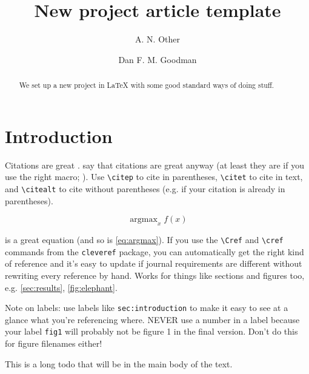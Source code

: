 \documentclass{article}
\title{New project article template}
\author[1]{A. N. Other}
\author[1]{Dan F. M. Goodman}
\affil[1]{Imperial College London}
\date{}
\DeclareMathOperator{\argmax}{argmax}
\newcommand{\todo}[1]{\marginpar{\scriptsize\color{red}\raggedright #1}}
\newcommand{\longtodo}[1]{{\color{red} #1}}
\begin{document}
\maketitle


\begin{abstract}
	\begin{itemize}
        We set up a new project in LaTeX with some good standard ways of doing stuff.
	\end{itemize}
\end{abstract}

\section{Introduction}\label{sec:introduction}

\todo{Are citations really great?}
Citations are great \citep{Goodman2009,perez-nieves_sparse_2021}.
\citet{Goodman2009} say that citations are great anyway (at least they are if you use the right macro; \citealt{perez-nieves_sparse_2021}). Use \texttt{\textbackslash{}citep} to cite in parentheses, \texttt{\textbackslash{}citet} to cite in text, and \texttt{\textbackslash{}citealt} to cite without parentheses (e.g. if your citation is already in parentheses).

\begin{equation}
    \argmax_{x} f(x)
    \label{eq:argmax}
\end{equation}

 is a great equation (and so is \cref{eq:argmax}). If you use the \texttt{\textbackslash{}Cref} and \texttt{\textbackslash{}cref} commands from the \texttt{cleveref} package, you can automatically get the right kind of reference and it's easy to update if journal requirements are different without rewriting every reference by hand. Works for things like sections and figures too, e.g. \cref{sec:results}, \cref{fig:elephant}.

Note on labels: use labels like \texttt{sec:introduction} to make it easy to see at a glance what you're referencing where. NEVER use a number in a label because your label \texttt{fig1} will probably not be figure 1 in the final version. Don't do this for figure filenames either!

\longtodo{This is a long todo that will be in the main body of the text.}
\end{document}
